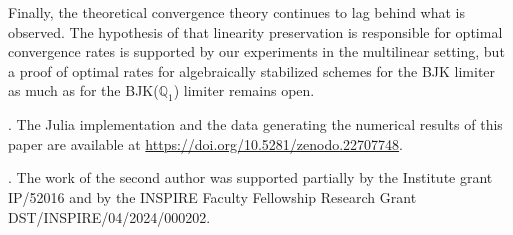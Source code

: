 \documentclass[a4paper]{article}
\theoremstyle{plain}
\theoremstyle{definition}
\theoremstyle{remark}
\begin{document}
Finally, the theoretical convergence theory continues to lag behind what is observed.
The hypothesis of \cite{BJK17} that linearity preservation is responsible for optimal
convergence rates is supported by our experiments in the multilinear setting, but a
proof of optimal rates for algebraically stabilized schemes for the BJK limiter as
much as for the BJK($\mathbb{Q}_1$) limiter remains open.

.
The Julia implementation and the data generating the numerical results of this
paper are available at \url{https://doi.org/10.5281/zenodo.22707748}.

.
The work of the second author was supported partially by the Institute grant IP/52016 and by the INSPIRE Faculty Fellowship Research Grant DST/INSPIRE/04/2024/000202.



\end{document}

